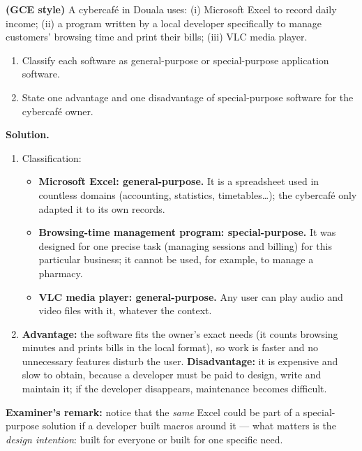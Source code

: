 \documentclass[11pt]{article}
\begin{document}
\begin{exoresolu}
\textbf{(GCE style)} A cybercafé in Douala uses: (i) Microsoft Excel to record daily income; (ii) a program written by a local developer specifically to manage customers' browsing time and print their bills; (iii) VLC media player.
\begin{enumerate}
\item Classify each software as general-purpose or special-purpose application software.
\item State one advantage and one disadvantage of special-purpose software for the cybercafé owner.
\end{enumerate}
\tcblower
\textbf{Solution.}
\begin{enumerate}
\item Classification:
\begin{itemize}
\item \textbf{Microsoft Excel: general-purpose.} It is a spreadsheet used in countless domains (accounting, statistics, timetables\ldots); the cybercafé only adapted it to its own records.
\item \textbf{Browsing-time management program: special-purpose.} It was designed for one precise task (managing sessions and billing) for this particular business; it cannot be used, for example, to manage a pharmacy.
\item \textbf{VLC media player: general-purpose.} Any user can play audio and video files with it, whatever the context.
\end{itemize}
\item \textbf{Advantage:} the software fits the owner's exact needs (it counts browsing minutes and prints bills in the local format), so work is faster and no unnecessary features disturb the user. \textbf{Disadvantage:} it is expensive and slow to obtain, because a developer must be paid to design, write and maintain it; if the developer disappears, maintenance becomes difficult.
\end{enumerate}
\textbf{Examiner's remark:} notice that the \emph{same} Excel could be part of a special-purpose solution if a developer built macros around it --- what matters is the \emph{design intention}: built for everyone or built for one specific need.
\end{exoresolu}
\end{document}
